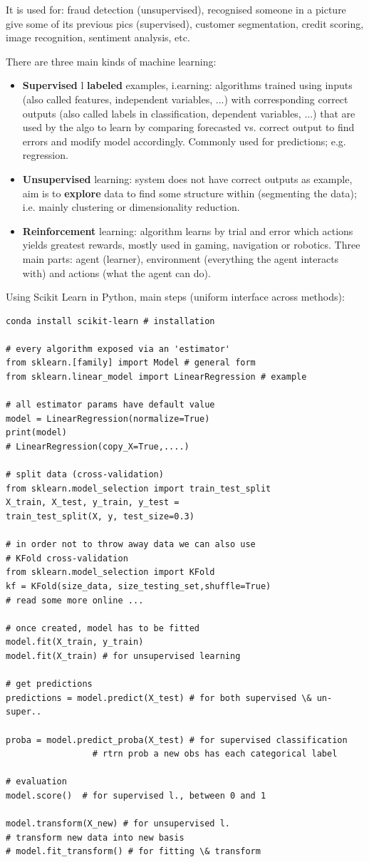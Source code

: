 \documentclass[12pt]{article}
\begin{document}
It is used for: fraud detection (unsupervised), recognised someone in a picture give some of its previous pics (supervised), customer segmentation, credit scoring, image recognition, sentiment analysis, etc.

There are three main kinds of machine learning:
\begin{itemize}
	\item \textbf{Supervised} l \textbf{labeled} examples, i.earning: algorithms trained using inputs (also called features, independent variables, ...) with corresponding correct outputs (also called labels in classification, dependent variables, ...) that are used by the algo to learn by comparing forecasted vs. correct output to find errors and modify model accordingly. Commonly used for predictions; e.g. regression.
	\item \textbf{Unsupervised} learning: system does not have correct outputs as example, aim is to \textbf{explore} data to find some structure within (segmenting the data); i.e. mainly clustering or dimensionality reduction.
	\item \textbf{Reinforcement} learning: algorithm learns by trial and error which actions yields greatest rewards, mostly used in gaming, navigation or robotics.	Three main parts: agent (learner), environment (everything the agent interacts with) and actions (what the
	agent can do).
\end{itemize}

Using Scikit Learn in Python, main steps (uniform interface across methods):
\begin{lstlisting}
conda install scikit-learn # installation

# every algorithm exposed via an 'estimator'
from sklearn.[family] import Model # general form
from sklearn.linear_model import LinearRegression # example

# all estimator params have default value
model = LinearRegression(normalize=True)
print(model)
# LinearRegression(copy_X=True,....)

# split data (cross-validation)
from sklearn.model_selection import train_test_split
X_train, X_test, y_train, y_test = 
train_test_split(X, y, test_size=0.3)

# in order not to throw away data we can also use
# KFold cross-validation
from sklearn.model_selection import KFold
kf = KFold(size_data, size_testing_set,shuffle=True)
# read some more online ...

# once created, model has to be fitted
model.fit(X_train, y_train)
model.fit(X_train) # for unsupervised learning

# get predictions
predictions = model.predict(X_test) # for both supervised \& un-super..

proba = model.predict_proba(X_test) # for supervised classification
                 # rtrn prob a new obs has each categorical label      

# evaluation
model.score()  # for supervised l., between 0 and 1

model.transform(X_new) # for unsupervised l.
# transform new data into new basis
# model.fit_transform() # for fitting \& transform
\end{lstlisting} 
\end{document}
